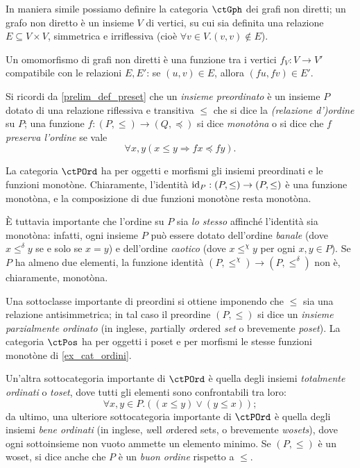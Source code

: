 \begin{example}\label{ex_cat_grafi_nondiretti}
	In maniera simile possiamo definire la categoria \(\ctGph\) dei grafi non diretti; un grafo non diretto è un insieme \(V\) di vertici, su cui sia definita una relazione \(E\subseteq V\times V\), simmetrica e irriflessiva (cioè \(\forall v\in V.(v,v)\notin E\)).

	Un omomorfismo di grafi non diretti è una funzione tra i vertici \(f_V : V\to V'\) compatibile con le relazioni \(E,E'\): se \((u,v)\in E\), allora \((fu,fv)\in E'\).
\end{example}
\begin{example}\label{ex_cat_ordini}
	Si ricordi da \ref{prelim_def_preset} che un \emph{insieme preordinato} è un insieme \(P\) dotato di una relazione riflessiva e transitiva \(\le\) che si dice la \emph{(relazione d')ordine} su \(P\); una funzione \(f : (P,\le)\to (Q,\preceq)\) si dice \emph{monotòna} o si dice che \(f\) \emph{preserva l'ordine} se vale
	\[\forall x,y(x\le y\Rightarrow fx\preceq fy).\]

	La categoria \(\ctPOrd\) ha per oggetti e morfismi gli insiemi preordinati e le funzioni monotòne. Chiaramente, l'identità \(\mathrm{id}_P : (P,\le)\to (P,\le)\) è una funzione monotòna, e la composizione di due funzioni monotòne resta monotòna.

	\`E tuttavia importante che l'ordine su \(P\) sia \emph{lo stesso} affinché l'identità sia monotòna: infatti, ogni insieme \(P\) può essere dotato dell'ordine \emph{banale} (dove \(x \mathrel{\le^\delta} y\) se e solo se \(x=y\)) e dell'ordine \emph{caotico} (dove \(x\mathrel{\le^\chi} y\) per ogni \(x,y\in P\)). Se \(P\) ha almeno due elementi, la funzione identità \((P,\le^\chi)\to (P,\le^\delta)\) non è, chiaramente, monotòna.
\end{example}
\begin{remark}[po, wo e to]\label{po_wo_to}
	Una sottoclasse importante di preordini si ottiene imponendo che \(\le\) sia una relazione antisimmetrica; in tal caso il preordine \((P,\le)\) si dice un \emph{insieme parzialmente ordinato} (in inglese, \emph{p}artially \emph{o}rdered \emph{set} o brevemente \emph{poset}). La categoria \(\ctPos\) ha per oggetti i poset e per morfismi le stesse funzioni monotòne di \ref{ex_cat_ordini}.

	Un'altra sottocategoria importante di \(\ctPOrd\) è quella degli insiemi \emph{totalmente ordinati} o \emph{toset}, dove tutti gli elementi sono confrontabili tra loro:
	\[\forall x,y\in P.((x\le y)\lor (y\le x));\]
	da ultimo, una ulteriore sottocategoria importante di \(\ctPOrd\) è quella degli insiemi \emph{bene ordinati} (in inglese, \emph{w}ell \emph{o}rdered sets, o brevemente \emph{wosets}), dove ogni sottoinsieme non vuoto ammette un elemento minimo. Se \((P,\le)\) è un woset, si dice anche che \(P\) è un \emph{buon ordine} rispetto a \(\le\).
\end{remark}
